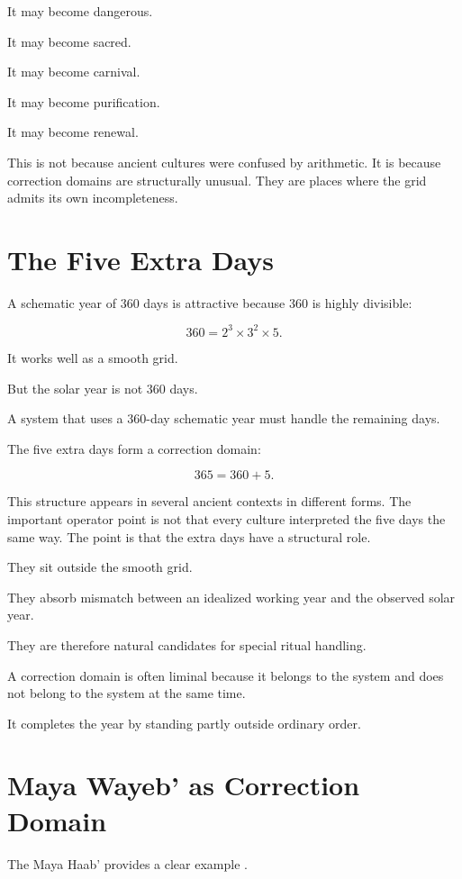 \documentclass[11pt]{book}
\begin{document}
It may become dangerous.

It may become sacred.

It may become carnival.

It may become purification.

It may become renewal.

This is not because ancient cultures were confused by arithmetic. It is because correction domains are structurally unusual. They are places where the grid admits its own incompleteness.

\section{The Five Extra Days}

A schematic year of \(360\) days is attractive because \(360\) is highly divisible:

\[
360 = 2^3 \times 3^2 \times 5.
\]

It works well as a smooth grid.

But the solar year is not \(360\) days.

A system that uses a \(360\)-day schematic year must handle the remaining days.

The five extra days form a correction domain:

\[
365 = 360 + 5.
\]

This structure appears in several ancient contexts in different forms. The important operator point is not that every culture interpreted the five days the same way. The point is that the extra days have a structural role.

They sit outside the smooth grid.

They absorb mismatch between an idealized working year and the observed solar year.

They are therefore natural candidates for special ritual handling.

A correction domain is often liminal because it belongs to the system and does not belong to the system at the same time.

It completes the year by standing partly outside ordinary order.

\section{Maya Wayeb' as Correction Domain}

The Maya Haab’ provides a clear example \cite{BrickerBricker2011AstronomyMayaCodices,Thompson1950MayaHieroglyphicWriting,Coe2011Maya}.
\end{document}

